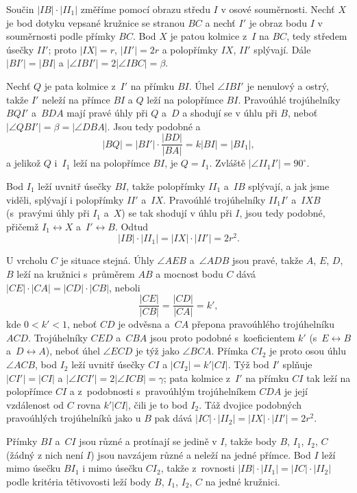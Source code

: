 {    Součin $|IB| \cdot |II_1|$ změříme pomocí obrazu středu $I$ v osové souměrnosti. Nechť $X$ je bod dotyku vepsané kružnice se stranou $BC$ a nechť $I'$ je obraz bodu $I$ v souměrnosti podle přímky $BC$. Bod $X$ je patou kolmice z~$I$ na $BC$, tedy středem úsečky $II'$; proto $|IX| = r$, $|II'| = 2r$ a polopřímky $IX$, $II'$ splývají. Dále $|BI'| = |BI|$ a $|\angle IBI'| = 2|\angle IBC| = \beta$.

    Nechť $Q$ je pata kolmice z~$I'$ na přímku $BI$. Úhel $\angle IBI'$ je nenulový a ostrý, takže $I'$ neleží na přímce $BI$ a $Q$ leží na polopřímce $BI$. Pravoúhlé trojúhelníky $BQI'$ a~$BDA$ mají pravé úhly při $Q$ a~$D$ a shodují se v úhlu při $B$, neboť $|\angle QBI'| = \beta = |\angle DBA|$. Jsou tedy podobné a
    $$
    |BQ| = |BI'| \cdot \frac{|BD|}{|BA|} = k|BI| = |BI_1|,
    $$
    a jelikož $Q$ i~$I_1$ leží na polopřímce $BI$, je $Q = I_1$. Zvláště $|\angle II_1I'| = 90^\circ$.

    Bod $I_1$ leží uvnitř úsečky $BI$, takže polopřímky $II_1$ a~$IB$ splývají, a jak jsme viděli, splývají i polopřímky $II'$ a~$IX$. Pravoúhlé trojúhelníky $II_1I'$ a~$IXB$ (s~pravými úhly při $I_1$ a~$X$) se tak shodují v úhlu při $I$, jsou tedy podobné, přičemž $I_1 \leftrightarrow X$ a~$I' \leftrightarrow B$. Odtud
    $$
    |IB| \cdot |II_1| = |IX| \cdot |II'| = 2r^2.
    $$

    U vrcholu $C$ je situace stejná. Úhly $\angle AEB$ a~$\angle ADB$ jsou pravé, takže $A$, $E$, $D$, $B$ leží na kružnici s~průměrem $AB$ a mocnost bodu $C$ dává $|CE| \cdot |CA| = |CD| \cdot |CB|$, neboli
    $$
    \frac{|CE|}{|CB|} = \frac{|CD|}{|CA|} = k',
    $$
    kde $0 < k' < 1$, neboť $CD$ je odvěsna a~$CA$ přepona pravoúhlého trojúhelníku $ACD$. Trojúhelníky $CED$ a~$CBA$ jsou proto podobné s~koeficientem $k'$ (s~$E \leftrightarrow B$ a~$D \leftrightarrow A$), neboť úhel $\angle ECD$ je týž jako $\angle BCA$. Přímka $CI_2$ je proto osou úhlu $\angle ACB$, bod $I_2$ leží uvnitř úsečky $CI$ a $|CI_2| = k'|CI|$. Týž bod $I'$ splňuje $|CI'| = |CI|$ a $|\angle ICI'| = 2|\angle ICB| = \gamma$; pata kolmice z~$I'$ na přímku $CI$ tak leží na polopřímce $CI$ a z~podobnosti s~pravoúhlým trojúhelníkem $CDA$ je její vzdálenost od $C$ rovna $k'|CI|$, čili je to bod $I_2$. Táž dvojice podobných pravoúhlých trojúhelníků jako u $B$ pak dává $|IC| \cdot |II_2| = |IX| \cdot |II'| = 2r^2$.

    Přímky $BI$ a~$CI$ jsou různé a protínají se jedině v $I$, takže body $B$, $I_1$, $I_2$, $C$ (žádný z nich není $I$) jsou navzájem různé a neleží na jedné přímce. Bod $I$ leží mimo úsečku $BI_1$ i mimo úsečku $CI_2$, takže z~rovnosti $|IB| \cdot |II_1| = |IC| \cdot |II_2|$ podle kritéria tětivovosti leží body $B$, $I_1$, $I_2$, $C$ na jedné kružnici.

}

